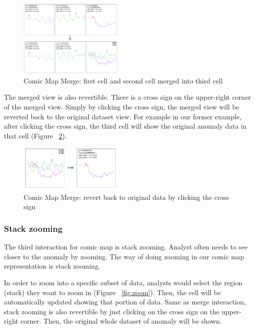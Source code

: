 \documentclass{vgtc}                          %
\begin{document}
\begin{figure}[htb]
	\centering
	\includegraphics[width=0.45\textwidth]{merge.jpg}
	\caption{Comic Map Merge: first cell and second cell merged into third cell}
	\label{fig:merge}
\end{figure}

The merged view is also revertible. There is a cross sign on the upper-right corner of the merged view. Simply by clicking the cross sign, the merged view will be reverted back to the original dataset view. For example in our former example, after clicking the cross sign, the third cell will show the original anomaly data in that cell (Figure ~\ref{fig:merge2}).

\begin{figure}[htb]
	\centering
	\includegraphics[width=0.45\textwidth]{merge2.jpg}
	\caption{Comic Map Merge: revert back to original data by clicking the cross sign}
	\label{fig:merge2}
\end{figure}

\subsubsection{Stack zooming}
The third interaction for comic map is stack zooming. Analyst often needs to see closer to the anomaly by zooming. The way of doing zooming in our comic map representation is stack zooming.

In order to zoom into a specific subset of data, analysts would select the region (stack) they want to zoom in (Figure ~\ref{fig:zoom}). Then, the cell will be automatically updated showing that portion of data. Same as merge interaction, stack zooming is also revertible by just clicking on the cross sign on the upper-right corner. Then, the original whole dataset of anomaly will be shown.
\end{document}
